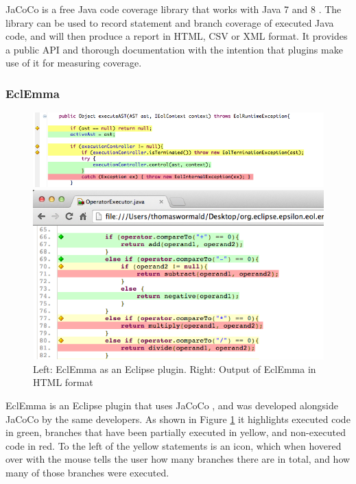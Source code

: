 JaCoCo is a free Java code coverage library that works with Java 7 and 8 \cite{JaCoCo}. The library can be used to record statement and branch coverage of executed Java code, and will then produce a report in HTML, CSV or XML format. It provides a public API and thorough documentation with the intention that plugins make use of it for measuring coverage.

\subsubsection{EclEmma}

\begin{figure}
\begin{minipage}[b]{0.44\textwidth}
\centering
\includegraphics[width=0.9\linewidth]{figures/EclEmma}
\end{minipage}
\begin{minipage}[b]{0.1\textwidth}
\vspace{3.00mm}
\end{minipage}
\begin{minipage}[b]{0.44\textwidth}
\centering
\includegraphics[width=0.9\linewidth]{figures/EclEmmaHTML}
\end{minipage}
\caption{Left: EclEmma as an Eclipse plugin. Right: Output of EclEmma in HTML format}
\label{fig:eclemma}
\end{figure}

EclEmma is an Eclipse plugin that uses JaCoCo \cite{EclEmma}, and was developed alongside JaCoCo by the same developers. As shown in Figure \ref{fig:eclemma} it highlights executed code in green, branches that have been partially executed in yellow, and non-executed code in red. To the left of the yellow statements is an icon, which when hovered over with the mouse tells the user how many branches there are in total, and how many of those branches were executed.

